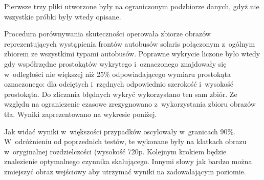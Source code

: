 Pierwsze trzy pliki utworzone były na ograniczonym podzbiorze danych, gdyż
nie wszystkie próbki były wtedy opisane.

Procedura porównywania skuteczności operowała zbiorze obrazów
reprezentujących wystąpienia frontów autobusów solaris połączonym
z~ogólnym zbiorem ze wszystkimi typami autobusów. Poprawne
wykrycie liczone było wtedy gdy współrzędne prostokątów wykrytego
i~oznaczonego znajdowały się w~odległości nie większej niż 25\% odpowiadającego
wymiaru prostokąta oznaczonego: dla odciętych i~rzędnych odpowiednio szerokość
i~wysokość prostokąta. Do zliczania błędnych wykryć wykorzystano ten sam zbiór.
Ze względu na ograniczenie czasowe zrezygnowano z~wykorzystania zbioru
obrazów tła. Wyniki zaprezentowano na wykresie poniżej.

\begin{center}
\end{center}

Jak widać wyniki w~większości przypadków oscylowały w~granicach 90\%.
W~odróżnieniu od poprzednich testów, te wykonane były na klatkach obrazu
w~oryginalnej rozdzielczości (wysokość 720p. Kolejnym krokiem będzie znalezienie
optymalnego czynnika skalującego. Innymi słowy jak bardzo można zmiejszyć
obraz wejściowy aby utrzymać wyniki na zadowalającym poziomie.
